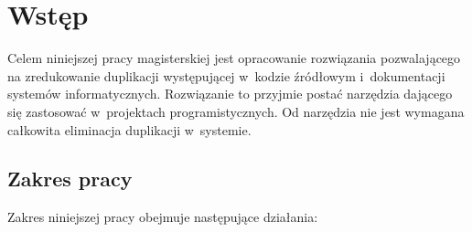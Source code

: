 \chapter{Wstęp} \label{chap:intro}

Celem niniejszej pracy magisterskiej jest opracowanie rozwiązania pozwalającego na zredukowanie duplikacji występującej w~kodzie źródłowym i~dokumentacji systemów informatycznych.
Rozwiązanie to przyjmie postać narzędzia dającego się zastosować w~projektach programistycznych.
Od narzędzia nie jest wymagana całkowita eliminacja duplikacji w~systemie.







\section{Zakres pracy}

Zakres niniejszej pracy obejmuje następujące działania:

